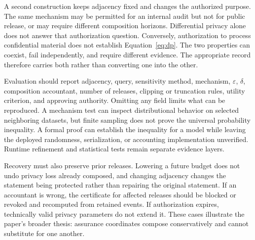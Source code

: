 A second construction keeps adjacency fixed and changes the authorized purpose. The same mechanism may be permitted for an internal audit but not for public release, or may require different composition horizons. Differential privacy alone does not answer that authorization question. Conversely, authorization to process confidential material does not establish Equation~\eqref{eq:dp}. The two properties can coexist, fail independently, and require different evidence. The appropriate record therefore carries both rather than converting one into the other.

Evaluation should report adjacency, query, sensitivity method, mechanism, $\varepsilon$, $\delta$, composition accountant, number of releases, clipping or truncation rules, utility criterion, and approving authority. Omitting any field limits what can be reproduced. A mechanism test can inspect distributional behavior on selected neighboring datasets, but finite sampling does not prove the universal probability inequality. A formal proof can establish the inequality for a model while leaving the deployed randomness, serialization, or accounting implementation unverified. Runtime refinement and statistical tests remain separate evidence layers.

Recovery must also preserve prior releases. Lowering a future budget does not undo privacy loss already composed, and changing adjacency changes the statement being protected rather than repairing the original statement. If an accountant is wrong, the certificate for affected releases should be blocked or revoked and recomputed from retained events. If authorization expires, technically valid privacy parameters do not extend it. These cases illustrate the paper's broader thesis: assurance coordinates compose conservatively and cannot substitute for one another.
